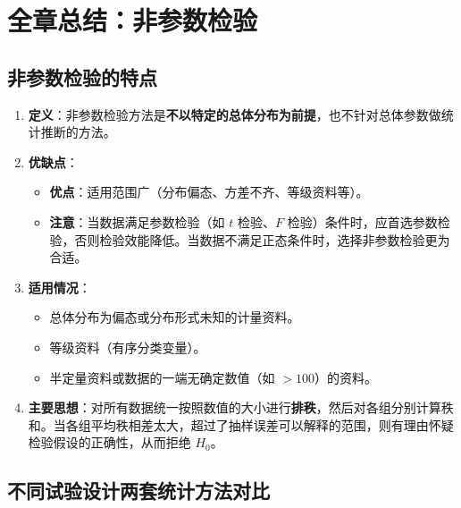 \documentclass[lang=cn,10pt]{elegantbook}
\begin{document}
\section{全章总结：非参数检验}

\subsection{非参数检验的特点}
\begin{enumerate}
    \item \textbf{定义}：非参数检验方法是\textbf{不以特定的总体分布为前提}，也不针对总体参数做统计推断的方法。
    \item \textbf{优缺点}：
    \begin{itemize}
        \item \textbf{优点}：适用范围广（分布偏态、方差不齐、等级资料等）。
        \item \textbf{注意}：当数据满足参数检验（如 $t$ 检验、$F$ 检验）条件时，应首选参数检验，否则检验效能降低。当数据不满足正态条件时，选择非参数检验更为合适。
    \end{itemize}
    \item \textbf{适用情况}：
    \begin{itemize}
        \item 总体分布为偏态或分布形式未知的计量资料。
        \item 等级资料（有序分类变量）。
        \item 半定量资料或数据的一端无确定数值（如 $>100$）的资料。
    \end{itemize}
    \item \textbf{主要思想}：对所有数据统一按照数值的大小进行\textbf{排秩}，然后对各组分别计算秩和。当各组平均秩相差太大，超过了抽样误差可以解释的范围，则有理由怀疑检验假设的正确性，从而拒绝 $H_0$。
\end{enumerate}

\subsection{不同试验设计两套统计方法对比}
\end{document}
